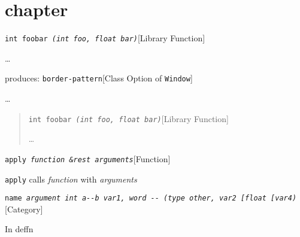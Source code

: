 \documentclass{book}
\begin{document}
\chapter{chapter}
\label{anchor:chapter}%

\noindent\texttt\bgroup{}int foobar \bgroup{}\normalfont{}\textsl{(int \textsl{foo}, float \textsl{bar})}\egroup{}\egroup{}\hfill[Library Function]



%
\dots{}\@

\noindent{}produces:
\noindent\texttt\bgroup{}border-pattern\egroup{}\hfill[Class Option of \texttt{Window}]



%
\dots{}\@

\begin{quote}
\noindent\texttt\bgroup{}int foobar \bgroup{}\normalfont{}\textsl{(int \textsl{foo}, float \textsl{bar})}\egroup{}\egroup{}\hfill[Library Function]



%
\dots{}\@
\end{quote}

\noindent\texttt\bgroup{}apply \bgroup{}\normalfont{}\textsl{function \&rest arguments}\egroup{}\egroup{}\hfill[Function]



%
\texttt{apply} calls \textsl{function} with \textsl{arguments}

\noindent\texttt\bgroup{}name \bgroup{}\normalfont{}\textsl{argument \texttt{int} \texttt{a{-}{-}b} \textsl{var1}, word \texttt{{-}{-}} (\texttt{type other}, \textsl{var2}  {[}\texttt{float} {[}\textsl{var4})}\egroup{}\egroup{}\hfill[Category]



%
In deffn
\end{document}

